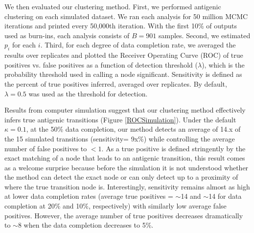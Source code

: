 \documentclass[11pt,oneside,letterpaper]{article}
\begin{document}



We then evaluated our clustering method.
First, we performed antigenic clustering on each simulated dataset.
We ran each analysis for 50 million MCMC iterations and printed every 50,000th iteration.
With the first 10\% of outputs used as burn-ins, each analysis consists of $B=901$ samples.
Second, we estimated $p_i$ for each $i$.
Third, for each degree of data completion rate, we averaged the results over replicates and plotted the Receiver Operating Curve (ROC) of true positives vs. false positives as a function of detection threshold ($\lambda$), which is the probability threshold used in calling a node significant.
Sensitivity is defined as the percent of true positives inferred, averaged over replicates. By default, $\lambda=0.5$ was used as the threshold for detection.


Results from computer simulation suggest that our clustering method effectively infers true antigenic transitions (Figure \ref{ROCSimulation}). 
Under the default $\kappa=0.1$, at the 50\% data completion, our method detects an average of 14.x of the 15 simulated transitions (sensitivity= 9x\%) while controlling the average number of false positives to $<1$. 
As a true positive is defined stringently by the exact matching of a node that leads to an antigenic transition, this result comes as a welcome surprise because before the simulation it is not understood whether the method can detect the exact node or can only detect up to a proximity of where the true transition node is.
Interestingly, sensitivity remains almost as high at lower data completion rates (average true positives = $\sim$14 and $\sim$14 for data completion at 20\% and 10\%, respectively) with similarly low average false positives. 
However, the average number of true positives decreases dramatically to $\sim$8 when the data completion decreases to 5\%. 
\end{document}

